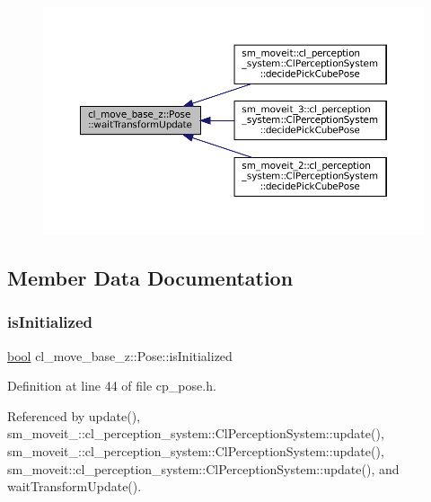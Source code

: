 \nopagebreak
\begin{figure}[H]
\begin{center}
\leavevmode
\includegraphics[width=350pt]{classcl__move__base__z_1_1Pose_a5f8576c3dacfb2f2e7f9df5105c480ea_icgraph}
\end{center}
\end{figure}


\subsection{Member Data Documentation}
\mbox{\label{classcl__move__base__z_1_1Pose_a49df3a978021edb71a48ef5e6d8e75a8}} 
\subsubsection{\texorpdfstring{is\+Initialized}{isInitialized}}
{\footnotesize\ttfamily \hyperlink{classbool}{bool} cl\+\_\+move\+\_\+base\+\_\+z\+::\+Pose\+::is\+Initialized}



Definition at line 44 of file cp\+\_\+pose.\+h.



Referenced by update(), sm\+\_\+moveit\+\_\+::cl\+\_\+perception\+\_\+system\+::\+Cl\+Perception\+System\+::update(), sm\+\_\+moveit\+\_\+::cl\+\_\+perception\+\_\+system\+::\+Cl\+Perception\+System\+::update(), sm\+\_\+moveit\+::cl\+\_\+perception\+\_\+system\+::\+Cl\+Perception\+System\+::update(), and wait\+Transform\+Update().

